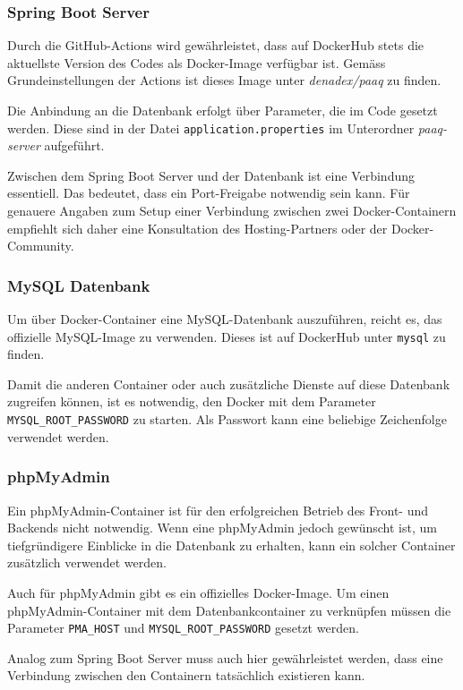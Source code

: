 \documentclass[../main.tex]{subfiles}
\begin{document}
	\subsubsection{Spring Boot Server}
	\par Durch die GitHub-Actions wird gewährleistet, dass auf DockerHub stets die aktuellste Version des Codes als Docker-Image verfügbar ist. Gemäss Grundeinstellungen der Actions ist dieses Image unter \textit{denadex/paaq} zu finden. 
	\par Die Anbindung an die Datenbank erfolgt über Parameter, die im Code gesetzt werden. Diese sind in der Datei \texttt{application.properties} im Unterordner \textit{paaq-server} aufgeführt.
	\par Zwischen dem Spring Boot Server und der Datenbank ist eine Verbindung essentiell. Das bedeutet, dass ein Port-Freigabe notwendig sein kann. Für genauere Angaben zum Setup einer Verbindung zwischen zwei Docker-Containern empfiehlt sich daher eine Konsultation des Hosting-Partners oder der Docker-Community.
	
	\subsubsection{MySQL Datenbank}
	\par Um über Docker-Container eine MySQL-Datenbank auszuführen, reicht es, das offizielle MySQL-Image zu verwenden. Dieses ist auf DockerHub unter \texttt{mysql} zu finden.
	\par Damit die anderen Container oder auch zusätzliche Dienste auf diese Datenbank zugreifen können, ist es notwendig, den Docker mit dem Parameter \texttt{MYSQL\_ROOT\_PASSWORD} zu starten. Als Passwort kann eine beliebige Zeichenfolge verwendet werden.
	
	\subsubsection{phpMyAdmin}
	\par Ein phpMyAdmin-Container ist für den erfolgreichen Betrieb des Front- und Backends nicht notwendig. Wenn eine phpMyAdmin jedoch gewünscht ist, um tiefgründigere Einblicke in die Datenbank zu erhalten, kann ein solcher Container zusätzlich verwendet werden.
	\par Auch für phpMyAdmin gibt es ein offizielles Docker-Image. Um einen phpMyAdmin-Container mit dem Datenbankcontainer zu verknüpfen müssen die Parameter \texttt{PMA\_HOST} und \texttt{MYSQL\_ROOT\_PASSWORD} gesetzt werden.
	\par Analog zum Spring Boot Server muss auch hier gewährleistet werden, dass eine Verbindung zwischen den Containern tatsächlich existieren kann.
	
\end{document}

